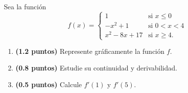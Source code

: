
Sea la función
\[
f(x)=\begin{cases}
1 & \text{si }x\leq0\\[4pt]
-x^2+1 & \text{si }0<x<4\\[4pt]
x^2-8x+17 & \text{si }x\geq4.
\end{cases}
\]
\begin{enumerate}[label=\alph*)]
\item \textbf{(1.2 puntos)} Represente gráficamente la función $f$.
\item \textbf{(0.8 puntos)} Estudie su continuidad y derivabilidad.
\item \textbf{(0.5 puntos)} Calcule $f'(1)$ y $f'(5)$.
\end{enumerate}
